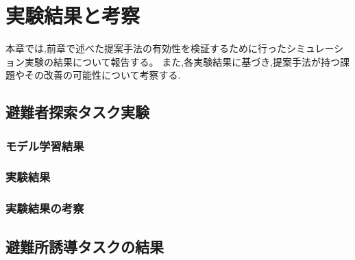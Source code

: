 \chapter{実験結果と考察}
本章では,前章で述べた提案手法の有効性を検証するために行ったシミュレーション実験の結果について報告する。
また,各実験結果に基づき,提案手法が持つ課題やその改善の可能性について考察する.

\section{避難者探索タスク実験}
\subsection{モデル学習結果}
\subsection{実験結果}
\subsection{実験結果の考察}

\section{避難所誘導タスクの結果}
